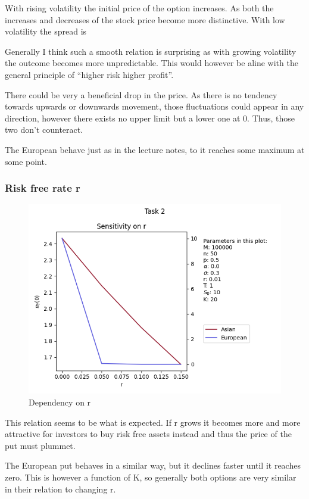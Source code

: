 With rising volatility the initial price of the option increases. As both the increases and decreases of the stock price become more distinctive. With low volatility the spread is 

Generally I think such a smooth relation is surprising as with growing volatility the outcome becomes more unpredictable. This would however be aline with the general principle of “higher risk higher profit”.

There could be very a beneficial drop in the price. As there is no tendency towards upwards or downwards movement, those fluctuations could appear in any direction, however there exists no upper limit but a lower one at 0. Thus, those two don’t counteract.


The European behave just as in the lecture notes, to it reaches some maximum at some point.

\newpage
\subsubsection{Risk free rate r}
\begin{figure}[!h]
    \centering
    \includegraphics[width=0.7\linewidth]{pictures/task2_r.png}
    \caption{Dependency on r}
    \label{fig:task2_r}
\end{figure}


This relation seems to be what is expected. If r grows it becomes more and more attractive for investors to buy risk free assets instead and thus the price of the put must plummet.

The European put behaves in a similar way, but it declines faster until it reaches zero. This is however a function of K, so generally both options are very similar in their relation to changing r.

\newpage
